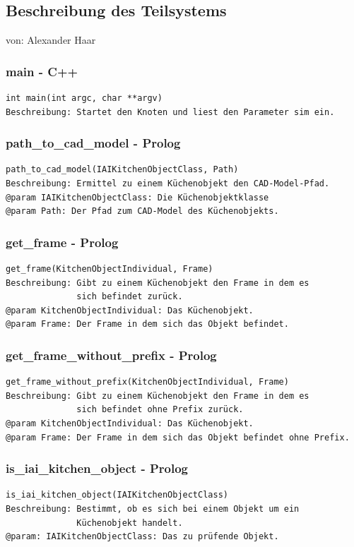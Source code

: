 \documentclass{suturo}
\makeatletter
\newcommand{\chapterauthor}[1]{%
  {\parindent0pt\vspace*{-27pt}%
  \linespread{0}\small\begin{flushright}von: #1\end{flushright}%
  \par\nobreak\vspace*{0pt}}
  \@afterheading%
}
\makeatother
\begin{document}
\subsection{Beschreibung des Teilsystems}
\chapterauthor{Alexander Haar}

\subsubsection{main - C++}
\begin{verbatim}
int main(int argc, char **argv)
Beschreibung: Startet den Knoten und liest den Parameter sim ein.
\end{verbatim}

\subsubsection{path\_to\_cad\_model - Prolog}
\begin{verbatim}
path_to_cad_model(IAIKitchenObjectClass, Path)
Beschreibung: Ermittel zu einem Küchenobjekt den CAD-Model-Pfad.
@param IAIKitchenObjectClass: Die Küchenobjektklasse
@param Path: Der Pfad zum CAD-Model des Küchenobjekts.
\end{verbatim}

\subsubsection{get\_frame - Prolog}
\begin{verbatim}
get_frame(KitchenObjectIndividual, Frame)
Beschreibung: Gibt zu einem Küchenobjekt den Frame in dem es 
              sich befindet zurück.
@param KitchenObjectIndividual: Das Küchenobjekt.
@param Frame: Der Frame in dem sich das Objekt befindet.
\end{verbatim}

\subsubsection{get\_frame\_without\_prefix - Prolog}
\begin{verbatim}
get_frame_without_prefix(KitchenObjectIndividual, Frame)
Beschreibung: Gibt zu einem Küchenobjekt den Frame in dem es 
              sich befindet ohne Prefix zurück.
@param KitchenObjectIndividual: Das Küchenobjekt.
@param Frame: Der Frame in dem sich das Objekt befindet ohne Prefix.
\end{verbatim}

\subsubsection{is\_iai\_kitchen\_object - Prolog}
\begin{verbatim}
is_iai_kitchen_object(IAIKitchenObjectClass)
Beschreibung: Bestimmt, ob es sich bei einem Objekt um ein 
              Küchenobjekt handelt.
@param: IAIKitchenObjectClass: Das zu prüfende Objekt.
\end{verbatim}
\end{document}
